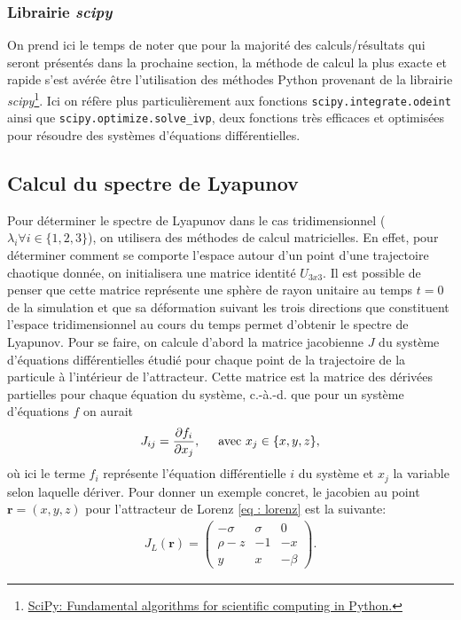     \subsubsection{Librairie \textit{scipy}} \label{subsubsec: scipy}
    On prend ici le temps de noter que pour la majorité des calculs/résultats qui seront présentés dans la prochaine section, la méthode de calcul la plus exacte et rapide s'est avérée être l'utilisation des méthodes Python provenant de la librairie \textit{scipy}\footnote{\href{https://scipy.org/}{SciPy: Fundamental algorithms for scientific computing in Python.}}. Ici on  réfère plus particulièrement aux fonctions \texttt{scipy.integrate.odeint} ainsi que \texttt{scipy.optimize.solve\_ivp}, deux fonctions très efficaces et optimisées pour résoudre des systèmes d'équations différentielles.

\subsection{Calcul du spectre de Lyapunov} \label{subsec: lyapunov_compute}
    Pour déterminer le spectre de Lyapunov dans le cas tridimensionnel ($\lambda_i\forall i\in\{1, 2, 3\}$), on utilisera des méthodes de calcul matricielles. En effet, pour déterminer comment se comporte l'espace autour d'un point d'une trajectoire chaotique donnée, on initialisera une matrice identité $U_{3x3}$. Il est possible de penser que cette matrice représente une sphère de rayon unitaire au temps $t=0$ de la simulation et que sa déformation suivant les trois directions que constituent l'espace tridimensionnel au cours du temps permet d'obtenir le spectre de Lyapunov. Pour se faire, on calcule d'abord la matrice jacobienne $J$ du système d'équations différentielles étudié pour chaque point de la trajectoire de la particule à l'intérieur de l'attracteur. Cette matrice est la matrice des dérivées partielles pour chaque équation du système, c.-à.-d. que pour un système d'équations $f$ on aurait
    \begin{align*}
        J_{ij} = \frac{\partial f_i}{\partial x_j},\hspace{0.5cm}\text{avec }x_j\in\{x, y, z\},
    \end{align*}
    où ici le terme $f_i$ représente l'équation différentielle $i$ du système et $x_j$ la variable selon laquelle dériver. Pour donner un exemple concret, le jacobien au point $\bm{r} = (x, y, z)$ pour l'attracteur de Lorenz \eqref{eq : lorenz} est la suivante:
    \begin{align*}
        J_L(\bm{r}) = 
        \begin{pmatrix}
            -\sigma & \sigma & 0 \\
            \rho - z & -1 & -x \\
            y & x & -\beta
        \end{pmatrix}.
    \end{align*}


